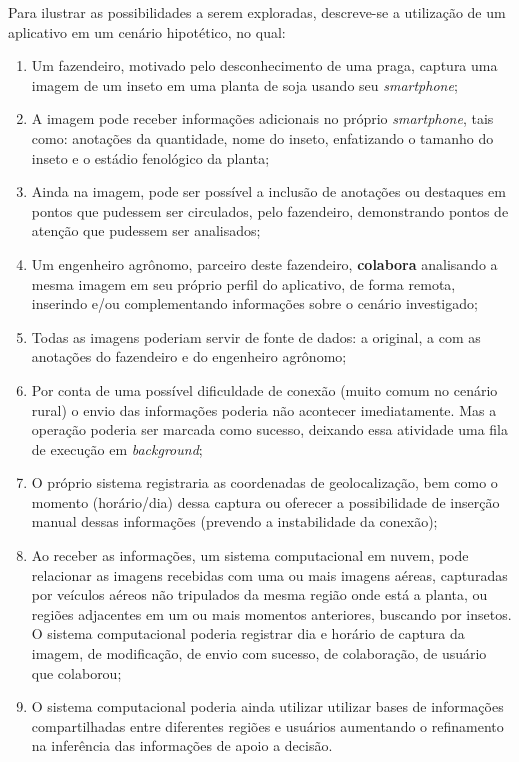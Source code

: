 \documentclass[12pt]{article}
\begin{document}
Para ilustrar as possibilidades a serem exploradas, descreve-se a utilização de um aplicativo em um cenário hipotético, no qual:

\begin{enumerate}
	\item Um fazendeiro, motivado pelo desconhecimento de uma praga, captura uma imagem de um inseto em uma planta de soja usando seu \textit{smartphone};
	\item A imagem pode receber informações adicionais no próprio \textit{smartphone}, tais como: anotações da quantidade, nome do inseto, enfatizando o tamanho do inseto e o estádio fenológico da planta;
	\item Ainda na imagem, pode ser possível a inclusão de anotações ou destaques em pontos que pudessem ser circulados, pelo fazendeiro, demonstrando pontos de atenção que pudessem ser analisados;
	\item Um engenheiro agrônomo, parceiro deste fazendeiro, \textbf{colabora} analisando a mesma imagem em seu próprio perfil do aplicativo, de forma remota, inserindo e/ou complementando informações sobre o cenário investigado;
	\item Todas as imagens poderiam servir de fonte de dados: a original, a com as anotações do fazendeiro e do engenheiro agrônomo;
	\item Por conta de uma possível dificuldade de conexão (muito comum no cenário rural) o envio das informações poderia não acontecer imediatamente. Mas a operação poderia ser marcada como sucesso, deixando essa atividade uma fila de execução em \textit{background};
	\item O próprio sistema registraria as coordenadas de geolocalização, bem como o momento (horário/dia) dessa captura ou oferecer a possibilidade de inserção manual dessas informações (prevendo a instabilidade da conexão);
	\item Ao receber as informações, um sistema computacional em nuvem, pode relacionar as imagens recebidas com uma ou mais imagens aéreas, capturadas por veículos aéreos não tripulados da mesma região onde está a planta, ou regiões adjacentes em um ou mais momentos anteriores, buscando por insetos. O sistema computacional poderia registrar dia e horário de captura da imagem, de modificação, de envio com sucesso, de colaboração, de usuário que colaborou;
	\item O sistema computacional poderia ainda utilizar utilizar bases de informações compartilhadas entre diferentes regiões e usuários aumentando o refinamento na inferência das informações de apoio a decisão.
\end{enumerate}
\end{document}

